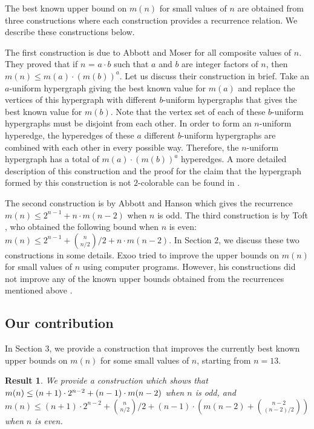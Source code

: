 \documentclass[11pt]{article}
\newtheorem{result}{Result}
\begin{document}
The best known upper bound on $m(n)$ for small values of $n$ are obtained from three constructions where each construction provides a recurrence relation. We describe these constructions below.


The first construction is due to Abbott and Moser \cite{abb&mos} for all composite values of $n$. They proved that if $n$ = $a \cdot b$ such that $a$ and $b$ are integer factors of $n$, then $m(n) \leq m(a) \cdot (m(b))^a$. Let us discuss their construction in brief. Take an $a$-uniform hypergraph giving the best known value for $m(a)$ and replace the vertices of this hypergraph with different $b$-uniform hypergraphs that gives the best known value for $m(b)$. Note that the vertex set of each of these $b$-uniform hypergraphs must be disjoint from each other. In order to form an $n$-uniform hyperedge, the hyperedges of these $a$ different $b$-uniform hypergraphs are combined with each other in every possible way. Therefore, the $n$-uniform hypergraph has a total of $m(a) \cdot (m(b))^a$ hyperedges. A more detailed description of this construction and the proof for the claim that the hypergraph formed by this construction is not $2$-colorable can be found in \cite{abb&mos}.


The second construction is by Abbott and Hanson \cite{Abbott} which gives the recurrence $m(n) \leq 2^{n-1} + n \cdot m(n-2)$ when $n$ is odd. The third construction is by Toft \cite{toft2}, who obtained the following bound when $n$ is even: $m(n) \leq 2^{n-1} + {n \choose {n / 2}} / {2} + n \cdot m(n-2)$. In Section $2$, we discuss these two constructions in some details. Exoo \cite{exoo} tried to improve the upper bounds on $m(n)$ for small values of $n$ using computer programs. However, his constructions did not improve any of the known upper bounds obtained from the recurrences mentioned above \cite{toft}. 

\subsection{Our contribution} In Section $3$, we provide a construction that improves the currently best known upper bounds on $m(n)$ for some small values of $n$, starting from $n = 13$. 

\begin{result}
We provide a construction which shows that $m(n) \leq (n+1) \cdot 2^{n-2} + \linebreak (n-1) \cdot m(n-2)$ when $n$ is odd, and $m(n) \leq (n+1) \cdot 2^{n-2} + {n \choose {n / 2}}/{2} + (n-1) \cdot \left( m(n-2) + {n-2 \choose {(n-2)}/{2}} \right)$ when $n$ is even.
\end{result}
\end{document}
